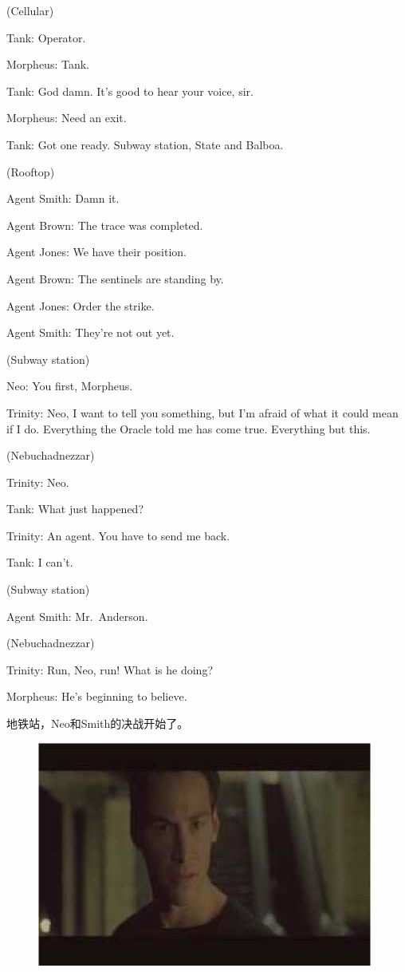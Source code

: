 \documentclass{ctexart}
\newenvironment{myquote}{\color{green} \setlength{\leftskip}{6em} \setlength{\rightskip}{4em} \setlength{\parindent}{-2em}}{\par}
\begin{document}
\begin{myquote}
(Cellular)

Tank: Operator.

Morpheus: Tank.

Tank: God damn. It's good to hear your voice, sir.

Morpheus: Need an exit.

Tank: Got one ready. Subway station, State and Balboa.

(Rooftop)

Agent Smith: Damn it.

Agent Brown: The trace was completed.

Agent Jones: We have their position.

Agent Brown: The sentinels are standing by.

Agent Jones: Order the strike.

Agent Smith: They're not out yet.

(Subway station)

Neo: You first, Morpheus.

Trinity: Neo, I want to tell you something, but I'm afraid of what it could mean if I do. Everything the Oracle told me has come true. Everything but this.

(Nebuchadnezzar)

Trinity: Neo.

Tank: What just happened?

Trinity: An agent. You have to send me back.

Tank: I can't.

(Subway station)

Agent Smith: Mr.~Anderson.

(Nebuchadnezzar)

Trinity: Run, Neo, run! What is he doing?

Morpheus: He's beginning to believe.
\end{myquote}

地铁站，Neo和Smith的决战开始了。

\begin{figure}[htb]
\centering
\includegraphics[width=0.5\linewidth]{fig/read_Matrix-71}
\end{figure}
\end{document}
